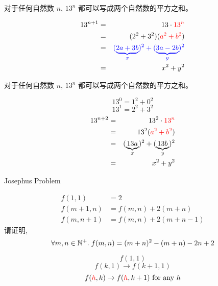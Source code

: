 
\begin{frame}{}
  \begin{theorem}
    对于任何自然数 $n$, $13^{n}$ 都可以写成两个自然数的平方之和。
  \end{theorem}

  \begin{eqnarray*}
    13^{n+1} &=& 13 \cdot \textcolor{red}{13^n} \\
    &=& (2^2+3^2)(\textcolor{red}{a^2 + b^2}) \\
    &=& \textcolor{blue}{(\underbrace{2a+3b}_x)^2 + (\underbrace{3a-2b}_y)^2} \\
    &=& x^2+y^2
  \end{eqnarray*}
\end{frame}

\begin{frame}{}
  \begin{theorem}
    对于任何自然数 $n$, $13^{n}$ 都可以写成两个自然数的平方之和。
  \end{theorem}

  \pause
  \[
    13^0 = 1^2 + 0^2
  \]
  \pause
  \[
    13^1 = 2^2 + 3^2
  \]
  \pause
  \begin{eqnarray*}
    13^{n+2} &=& 13^2\cdot \textcolor{red}{13^n} \\
    &=& 13^2(\textcolor{red}{a^2 + b^2}) \\
    &=& (\underbrace{13a}_x)^2 + (\underbrace{13b}_y)^2 \\
    &=& x^2+y^2
  \end{eqnarray*}
\end{frame}

\begin{frame}{}
  \begin{exampleblock}{Josephus Problem}
  \end{exampleblock}
\end{frame}

\begin{frame}{}
  \begin{exampleblock}{}
    \begin{align*}
      f(1, 1) &= 2 \\
      f(m+1, n) &= f(m,n) + 2(m+n) \\
      f(m, n+1) &= f(m,n) + 2(m+n-1)
    \end{align*}
    请证明,
    \[
      \forall m, n \in \mathbb{N}^{+}.\; f(m,n) = (m+n)^{2} - (m+n) - 2n + 2
    \]
  \end{exampleblock}

  \pause
  \begin{center}

    \pause
    \[
      f(1, 1)
    \]
    \pause
    \[
      f(k, 1) \to f(k+1, 1)
    \]
    \pause
    \[
      f(\textcolor{red}{h}, k) \to f(\textcolor{red}{h}, k+1) \text{ for any } h
    \]
  \end{center}
\end{frame}


